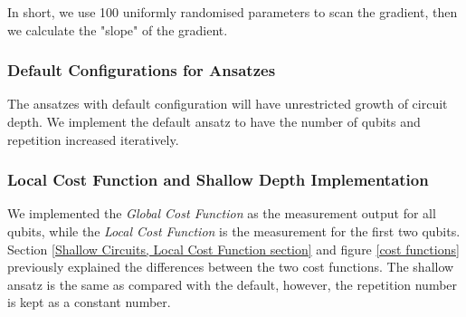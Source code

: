 In short, we use 100 uniformly randomised parameters to scan the gradient, then we calculate the "slope" of the gradient.

\subsubsection{Default Configurations for Ansatzes}
The ansatzes with default configuration will have unrestricted growth of circuit depth.
We implement the default ansatz to have the number of qubits and repetition increased iteratively.

\subsubsection{Local Cost Function and Shallow Depth Implementation}
We implemented the \textit{Global Cost Function} as the measurement output for all qubits, while the \textit{Local Cost Function} is the measurement for the first two qubits.
Section \ref{Shallow Circuits, Local Cost Function section} and figure \ref{cost functions} previously explained the differences between the two cost functions.
The shallow ansatz is the same as compared with the default, however, the repetition number is kept as a constant number.